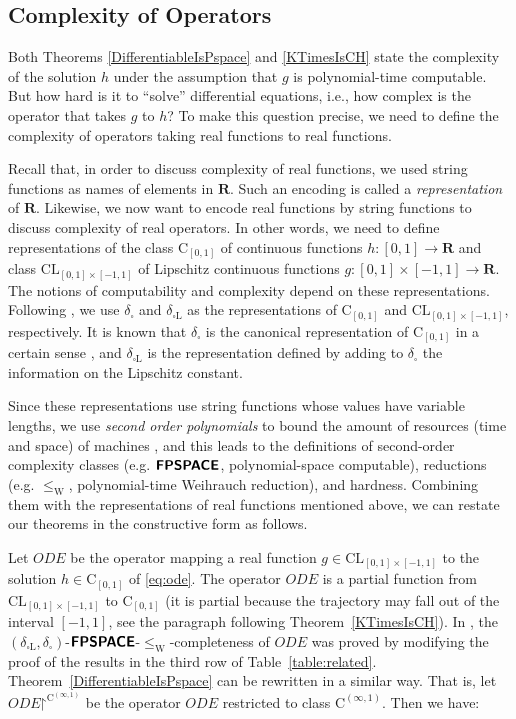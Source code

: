 \documentclass{lmcs}
\theoremstyle{definition}
\theoremstyle{remark}
\newcommand{\R}{\mathbf R}
\newcommand{\OpIVP}{\mathit{ODE}}
\newcommand{\deltabox}{\delta _\square}
\newcommand{\deltaboxLip}{\delta _{\square \mathrm L}}
\newcommand{\classtwofont}[1]{\text{\bfseries \sffamily \upshape #1}}
\newcommand{\classFPSPACEtwo}{\classtwofont{FPSPACE}}
\newcommand{\redW}{\leq _{\mathrm W}}
\newcommand{\classLip}{\mathrm{CL}}
\newcommand{\classC}{\mathrm C}
\begin{document}
\subsection{Complexity of Operators}
\label{section: constructive}

Both Theorems \ref{DifferentiableIsPspace} and \ref{KTimesIsCH}
state the complexity of the solution $h$ under the assumption 
that $g$ is polynomial-time computable.
But how hard is it to ``solve'' differential equations,
i.e., how complex is the operator that takes $g$ to $h$? 
To make this question precise,
we need to define the complexity of operators 
taking real functions to real functions.

Recall that, in order to discuss complexity of real functions,
we used string functions as names of elements in $\R$. 
Such an encoding is called a \emph{representation} of $\R$.
Likewise, 
we now want to encode real functions by string functions
to discuss complexity of real operators. 
In other words, we need to define representations of
the class $\classC _{[0, 1]}$ of continuous functions $h \colon [0,1] \to \R$ 
and class $\classLip _{[0, 1] \times [-1, 1]}$ of Lipschitz continuous functions $g \colon [0, 1] \times [-1, 1] \to \R$. 
The notions of computability and complexity depend on these representations.
Following \cite{kawamura2010operators},
we use $\deltabox$ and $\deltaboxLip$ as the 
representations of $\classC_{[0,1]}$ and $\classLip_{[0, 1] \times [-1, 1]}$, 
respectively.
It is known that 
$\deltabox$ is the canonical representation of $\classC_{[0, 1]}$ 
in a certain sense \cite{kawamura11:_funct_space_repres_and_polyn_time_comput}, 
and $\deltaboxLip$ is the representation defined by adding to $\deltabox$
the information on the Lipschitz constant.

Since these representations use string functions 
whose values have variable lengths,
we use \emph{second order polynomials}
to bound the amount of resources (time and space) of machines
\cite{kawamura2010operators}, 
and this leads to the definitions of second-order complexity classes
(e.g. $\classFPSPACEtwo$, polynomial-space computable),
reductions (e.g. $\redW$, polynomial-time Weihrauch reduction), 
and hardness.
Combining them with the representations of real functions mentioned above,
we can restate our theorems in the constructive form as follows.

Let $\OpIVP$ be the operator 
mapping a real function $g \in \classLip_{[0, 1] \times [-1, 1]}$ to
the solution $h \in \classC_{[0, 1]}$ of \eqref{eq:ode}.
The operator $\OpIVP$ is a partial function 
from $\classLip _{[0, 1] \times [-1, 1]}$ to $\classC _{[0, 1]}$
(it is partial because the trajectory may fall out of the interval $[-1, 1]$, 
see the paragraph following Theorem~\ref{KTimesIsCH}).
In \cite[Theorem 4.9]{kawamura2010operators}, the
$(\deltaboxLip, \deltabox)$-$\classFPSPACEtwo$-$\redW$-completeness of $\OpIVP$ 
was proved
by modifying
the proof of the results in the third row of Table~\ref{table:related}.
Theorem~\ref{DifferentiableIsPspace} can be rewritten in a similar way. 
That is, let $\OpIVP \mathord\upharpoonright ^{\classC ^{(\infty, 1)}}$ be the operator $\OpIVP$ 
restricted to class $\classC^{(\infty, 1)}$. Then we have: 
\end{document}
